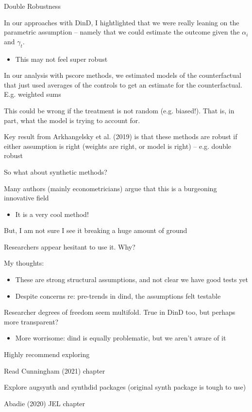 \documentclass[notes,11pt, aspectratio=169]{beamer}
\newenvironment{wideitemize}{\itemize\addtolength{\itemsep}{10pt}}{\enditemize}
\begin{document}
\begin{frame}{Double Robustness}
  \begin{wideitemize}
  \item   In our approaches with DinD, I hightlighted that we were really
  leaning on the parametric assumption -- namely that we could
  estimate the outcome given the $\alpha_{i}$ and $\gamma_{t}$.
  \begin{itemize}
  \item   This may not feel super robust
  \end{itemize}
\item   In our analysis with pscore methods, we estimated models of the
  counterfactual that just used averages of the controls to get an
  estimate for the counterfactual. E.g. weighted sums
\item   This could be wrong if the treatment is not random
  (e.g. biased!). That is, in part, what the model is trying to
  account for.
\item Key result from Arkhangelsky et al. (2019) is that these methods
  are robust if either assumption is right (weights are right, or
  model is right) -- e.g. double robust
  \end{wideitemize}
\end{frame}



\begin{frame}{So what about synthetic methods?}
  \begin{wideitemize}
  \item Many authors (mainly econometricians) argue that this is a burgeoning innovative field
    \begin{itemize}
    \item It is a very cool method!
    \end{itemize}
  \item But, I am not sure I see it breaking a huge amount of ground
  \item Researchers appear hesitant to use it. Why?
  \item  My thoughts:
    \begin{itemize}
    \item These are strong structural assumptions, and not clear we
      have good tests yet
    \item Despite concerns re: pre-trends in dind, the assumptions
      felt testable
    \end{itemize}
  \item Researcher degrees of freedom seem multifold. True in DinD
    too, but perhaps more transparent?
    \begin{itemize}
    \item More worrisome: dind is equally problematic, but we aren't
      aware of it
    \end{itemize}
  \end{wideitemize}
\end{frame}

\begin{frame}{Highly recommend exploring}
  \begin{wideitemize}
  \item Read Cunningham (2021) chapter
  \item Explore augsynth and synthdid  packages (original synth package is tough to use)
  \item Abadie (2020) JEL chapter
  \end{wideitemize}
\end{frame}
\end{document}
